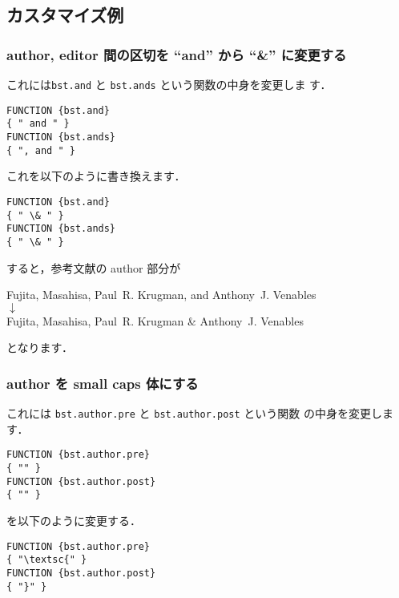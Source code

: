 \documentclass[article]{jlreq}
\begin{document}
\subsection{カスタマイズ例}

\subsubsection{author, editor 間の区切を ``and'' から ``\&'' に変更する}

これには\texttt{bst.and} と \texttt{bst.ands} という関数の中身を変更しま
す．
\begin{screen}
\begin{verbatim}
FUNCTION {bst.and}
{ " and " }
FUNCTION {bst.ands}
{ ", and " }
\end{verbatim}
\end{screen}

これを以下のように書き換えます．
\begin{screen}
\begin{verbatim}
FUNCTION {bst.and}
{ " \& " }
FUNCTION {bst.ands}
{ " \& " }
\end{verbatim}
\end{screen}

すると，参考文献の author 部分が
\begin{center}
Fujita, Masahisa, Paul~R. Krugman, and Anthony~J. Venables \\
 $\downarrow$ \\
Fujita, Masahisa, Paul~R. Krugman \& Anthony~J. Venables 
\end{center}
となります．

\subsubsection{author を small caps 体にする}

これには \texttt{bst.author.pre} と \texttt{bst.author.post} という関数
の中身を変更します．

\begin{screen}
\begin{verbatim}
FUNCTION {bst.author.pre}
{ "" }
FUNCTION {bst.author.post}
{ "" }
\end{verbatim}
\end{screen}
を以下のように変更する．
\begin{screen}
\begin{verbatim}
FUNCTION {bst.author.pre}
{ "\textsc{" }
FUNCTION {bst.author.post}
{ "}" }
\end{verbatim}
\end{screen}
\end{document}
